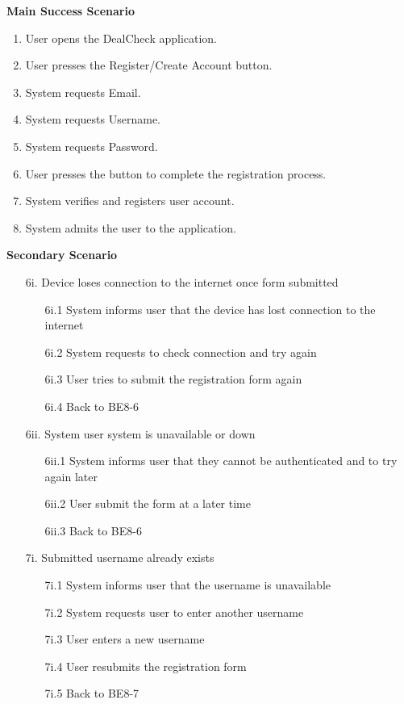 \documentclass[]{article}
\begin{document}
\begin{enumerate}[{\bf {BE}1.}]
{\bf Main Success Scenario}
    \begin{enumerate}[1.]
        \item User opens the DealCheck application.
        \item User presses the Register/Create Account button.
        \item System requests Email.
        \item System requests Username.
        \item System requests Password.
        \item User presses the button to complete the registration process.
        \item System verifies and registers user account.
        \item System admits the user to the application.
    \end{enumerate}
    
    {\bf Secondary Scenario} \\
    \begin{enumerate}
		\item [6i.] Device loses connection to the internet once form submitted
		\begin{enumerate}
			\item [6i.1] System informs user that the device has lost connection to the internet
			\item [6i.2] System requests to check connection and try again
			\item [6i.3] User tries to submit the registration form again
			\item [6i.4] Back to BE8-6
		\end{enumerate}

		\item [6ii.] System user system is unavailable or down
		\begin{enumerate}
			\item [6ii.1] System informs user that they cannot be authenticated and to try again later
			\item [6ii.2] User submit the form at a later time
			\item [6ii.3] Back to BE8-6
		\end{enumerate}

		\item [7i.] Submitted username already exists
		\begin{enumerate}
			\item [7i.1] System informs user that the username is unavailable
			\item [7i.2] System requests user to enter another username
			\item [7i.3] User enters a new username
			\item [7i.4] User resubmits the registration form
			\item [7i.5] Back to BE8-7
		\end{enumerate}


\end{enumerate}
\end{enumerate}
\end{document}
